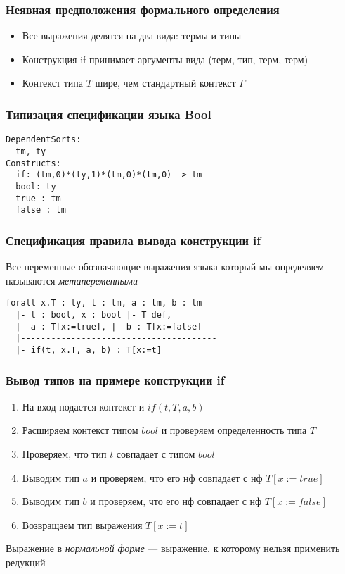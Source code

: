 
\begin{frame}
\frametitle{Неявная предположения формального определения}

\IFF

\begin{itemize}
\item Все выражения делятся на два вида: термы и типы
\item Конструкция if принимает аргументы вида (терм, тип, терм, терм)
\item Контекст типа $T$ шире, чем стандартный контекст $\Gamma$
\end{itemize}

\end{frame}

\begin{frame}[fragile]
\frametitle{Типизация спецификации языка Bool}
\begin{verbatim}
DependentSorts:
  tm, ty
Constructs:
  if: (tm,0)*(ty,1)*(tm,0)*(tm,0) -> tm
  bool: ty
  true : tm
  false : tm
\end{verbatim}
\end{frame}



\begin{frame}[fragile]
\frametitle{Спецификация правила вывода конструкции if}

\IFF


Все переменные обозначающие выражения языка который мы определяем --- называются \textit{метапеременными}

\begin{verbatim}
forall x.T : ty, t : tm, a : tm, b : tm
  |- t : bool, x : bool |- T def,
  |- a : T[x:=true], |- b : T[x:=false]
  |---------------------------------------
  |- if(t, x.T, a, b) : T[x:=t]
\end{verbatim}

\end{frame}
\begin{frame}
\frametitle{Вывод типов на примере конструкции if}

\IFF

\begin{enumerate}
\item На вход подается контекст и $if(t, T, a, b)$
\item Расширяем контекст типом $bool$ и проверяем определенность типа $T$
\item Проверяем, что тип $t$ совпадает с типом $bool$
\item Выводим тип $a$ и проверяем, что его нф совпадает с нф $T[x:=true]$
\item Выводим тип $b$ и проверяем, что его нф совпадает с нф $T[x:=false]$
\item Возвращаем тип выражения $T[x:=t]$
\end{enumerate}
Выражение в \textit{нормальной форме} --- выражение, к которому нельзя применить редукций
\end{frame}

